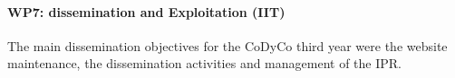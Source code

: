 \paragraph{WP7: dissemination and Exploitation (IIT)}

The main dissemination objectives for the CoDyCo third year were the website maintenance, the dissemination activities and management of the IPR.
